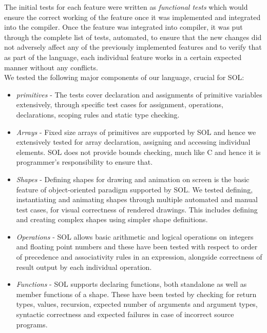 \documentclass[letterpaper,12pt]{report}
\begin{document}
    The initial tests for each feature were written as \textit{functional tests} which would ensure the correct working of the feature once it was implemented and integrated into the compiler. Once the feature was integrated into compiler, it was put through the complete list of tests, automated, to ensure that the new changes did not adversely affect any of the previously implemented features and to verify that as part of the language, each individual feature works in a certain expected manner without any conflicts.\\

    We tested the following major components of our language, crucial for SOL:
    \begin{itemize}
      \itemsep 0em
      \item \textit{primitives} - The tests cover declaration and assignments of primitive variables extensively, through specific test cases for assignment, operations, declarations, scoping rules and static type checking.

      \item \textit{Arrays} - Fixed size arrays of primitives are supported by SOL and hence we extensively tested for array declaration, assigning and accessing individual elements. SOL does not provide bounds checking, much like C and hence it is programmer's responsibility to ensure that.

      \item \textit{Shapes} - Defining shapes for drawing and animation on screen is the basic feature of object-oriented paradigm supported by SOL. We tested defining, instantiating and animating shapes through multiple automated and manual test cases, for visual correctness of rendered drawings. This includes defining and creating complex shapes using simpler shape definitions.

      \item \textit{Operations} - SOL allows basic arithmetic and logical operations on integers and floating point numbers and these have been tested with respect to order of precedence and associativity rules in an expression, alongside correctness of result output by each individual operation.

      \item \textit{Functions} - SOL supports declaring functions, both standalone as well as member functions of a shape. These have been tested by checking for return types, values, recursion, expected number of arguments and argument types, syntactic correctness and expected failures in case of incorrect source programs.


\end{itemize}
\end{document}
